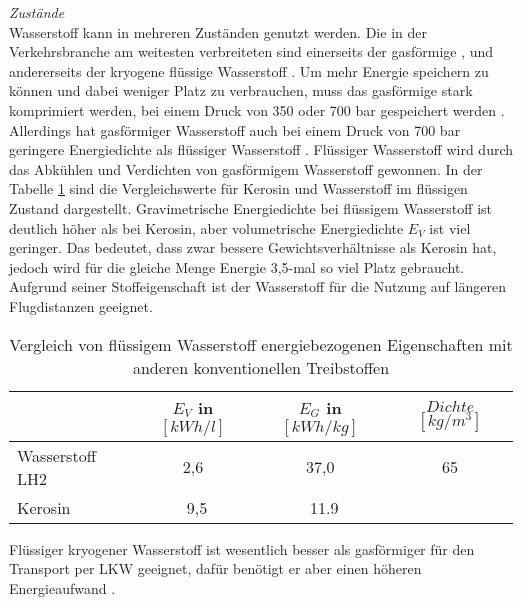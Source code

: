 %
\textit{Zustände}\\
Wasserstoff kann in mehreren Zuständen genutzt werden. Die in der Verkehrsbranche am weitesten verbreiteten
sind einerseits der gasförmige , und andererseits der kryogene flüssige Wasserstoff . 
Um mehr Energie speichern zu können und dabei weniger Platz zu verbrauchen, muss das gasförmige  stark komprimiert werden, 
bei einem Druck von 350 oder 700 bar gespeichert werden \cite{colpan2022fuel}.
Allerdings hat gasförmiger Wasserstoff auch bei einem Druck von 700 bar geringere Energiedichte
als flüssiger Wasserstoff \cite{eichlseder2012hydrogen}.
Flüssiger Wasserstoff wird durch das Abkühlen und Verdichten von gasförmigem Wasserstoff gewonnen.
In der Tabelle \ref{wasserstoff_energie} sind die Vergleichswerte für Kerosin und Wasserstoff im flüssigen Zustand dargestellt.
Gravimetrische Energiedichte bei flüssigem Wasserstoff ist deutlich höher als bei Kerosin, aber volumetrische Energiedichte $E_V$ ist viel geringer.
Das bedeutet, dass  zwar bessere Gewichtsverhältnisse als Kerosin hat, jedoch wird für die gleiche Menge Energie 3,5-mal so viel Platz gebraucht.
Aufgrund seiner Stoffeigenschaft ist der Wasserstoff für die Nutzung auf längeren Flugdistanzen geeignet.
\begin{table}[h]
	\begin{center}
    \caption{Vergleich von flüssigem Wasserstoff energiebezogenen Eigenschaften mit anderen konventionellen Treibstoffen}
	\label{wasserstoff_energie}
	\begin{tabular}{|l|c|c|c|}
		\hline
		& \textbf{$E_V$ in $[kWh/l]$} & \textbf{$E_G$ in $[kWh/kg]$} & \textbf{$Dichte$ $[kg/m^3]$}  \\ \hline
		Wasserstoff LH2 \cite{colpan2022fuel} & 2,6 & 37,0 & 65 \\ \hline
		Kerosin \cite{colpan2022fuel} & ~9,5 & ~11.9 &  \\ \hline
	\end{tabular}
    \end{center}
\end{table}
%
Flüssiger kryogener Wasserstoff ist wesentlich besser als gasförmiger für den Transport per LKW geeignet,
dafür benötigt er aber einen höheren Energieaufwand \cite{colpan2022fuel}. 

